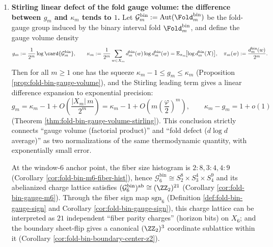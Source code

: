 \begin{enumerate}
  \item \textbf{Stirling linear defect of the fold gauge volume: the difference between \texorpdfstring{$g_m$}{gm} and \texorpdfstring{$\kappa_m$}{kappa} tends to \(1\).}
  Let
  \(\mathcal{G}^{\mathrm{bin}}_m:=\mathrm{Aut}(\Fold^{\mathrm{bin}}_m)\)
  be the fold-gauge group induced by the binary interval fold \(\Fold^{\mathrm{bin}}_m\), and define the gauge volume density
  \[
  g_m:=\frac{1}{2^m}\log\card{\mathcal{G}^{\mathrm{bin}}_m},
  \qquad
  \kappa_m
  :=\frac{1}{2^m}\sum_{w\in X_m}d^{\mathrm{bin}}_m(w)\log d^{\mathrm{bin}}_m(w)
  =\mathbb{E}_{\pi_m}\!\bigl[\log d^{\mathrm{bin}}_m(X)\bigr],
  \quad
  \pi_m(w):=\frac{d^{\mathrm{bin}}_m(w)}{2^m}.
  \]
  Then for all \(m\ge 1\) one has the squeeze
  \(
  \kappa_m-1\le g_m\le \kappa_m
  \)
  (Proposition \ref{prop:fold-bin-gauge-volume}), and the Stirling leading term gives a linear difference expansion to exponential precision:
  \[
  g_m=\kappa_m-1+O\!\left(\frac{|X_m|\,m}{2^m}\right)
  =\kappa_m-1+O\!\left(m\left(\frac{\varphi}{2}\right)^m\right),
  \qquad
  \kappa_m-g_m=1+o(1)
  \]
  (Theorem \ref{thm:fold-bin-gauge-volume-stirling}).
  This conclusion strictly connects ``gauge volume (factorial product)'' and ``fold defect (\(d\log d\) average)'' as two normalizations of the same thermodynamic quantity, with exponentially small error.
  \par
  At the window-\(6\) anchor point, the fiber size histogram is \(2:8,3:4,4:9\) (Corollary \ref{cor:fold-bin-m6-fiber-hist}), hence
  \(
  \mathcal{G}^{\mathrm{bin}}_6\cong S_{2}^{8}\times S_{3}^{4}\times S_{4}^{9}
  \)
  and its abelianized charge lattice satisfies
  \(
  (\mathcal{G}^{\mathrm{bin}}_6)^{\mathrm{ab}}\cong (\ZZ_2)^{21}
  \)
  (Corollary \ref{cor:fold-bin-gauge-m6}).
  Through the fiber sign map \(\mathrm{sgn}_6\) (Definition \ref{def:fold-bin-gauge-sign} and Corollary \ref{cor:fold-bin-gauge-sign}), this charge lattice can be interpreted as \(21\) independent ``fiber parity charges'' (horizon bits) on \(X_6\); and the boundary sheet-flip gives a canonical \((\ZZ_2)^3\) coordinate sublattice within it (Corollary \ref{cor:fold-bin-boundary-center-z2}).


\end{enumerate}
